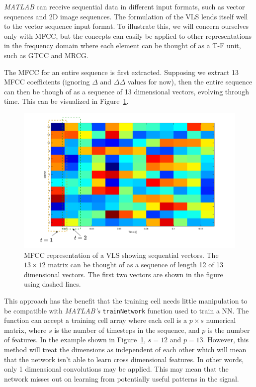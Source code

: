 \textit{MATLAB} can receive sequential data in different input formats, such as
vector sequences and 2D image sequences. The formulation of the VLS lends itself
well to the vector sequence input format. To illustrate this, we will concern
ourselves only with MFCC, but the concepts can easily be applied to other
representations in the frequency domain where each element can be thought of as
a T-F unit, such as GTCC and MRCG\@.

The MFCC for an entire sequence is first extracted. Supposing we extract 13 MFCC
coefficients (ignoring $\Delta$ and $\Delta\Delta$ values for now), then the
entire sequence can then be though of as a sequence of 13 dimensional vectors,
evolving through time. This can be visualized in
Figure~\ref{fig:mfcc_vector_sequence}.

\begin{figure}[ht]
  \centering
  \includegraphics[width=\textwidth]{figures/mfcc_vector_sequence_labelled.png}
  \caption{MFCC representation of a VLS showing sequential vectors. The $13
  \times 12$ matrix can be thought of as a sequence of length 12 of 13
dimensional vectors. The first two vectors are shown in the figure using
dashed lines.}\label{fig:mfcc_vector_sequence}
\end{figure}

This approach has the benefit that the training cell needs little
manipulation to be compatible with \textit{MATLAB's} \texttt{trainNetwork}
function used to train a NN\@. The function can accept a training cell array
where each cell is a $p \times s$ numerical matrix, where $s$ is the number
of timesteps in the sequence, and $p$ is the number of features. In the
example shown in Figure~\ref{fig:mfcc_vector_sequence}, $s=12$ and $p=13$.
However, this method will treat the dimensions as independent of each other
which will mean that the network isn't able to learn cross dimensional
features. In other words, only 1 dimensional convolutions may be applied.
This may mean that the network misses out on learning from potentially
useful patterns in the signal.


